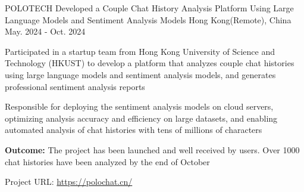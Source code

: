 
\newcommand{\expaddspace}[0]{
  \vspace{5.5mm}
}


\begin{cventries}

  \cventry
  {POLOTECH}
  {Developed a Couple Chat History Analysis Platform Using Large Language Models and Sentiment Analysis Models}
  {Hong Kong(Remote), China}
  {May. 2024 - Oct. 2024}
  {
    \begin{cvitems}
      \item {Participated in a startup team from Hong Kong University of Science and Technology (HKUST) to develop a platform that analyzes couple chat histories using large language models and sentiment analysis models, and generates professional sentiment analysis reports}
      \item {Responsible for deploying the sentiment analysis models on cloud servers, optimizing analysis accuracy and efficiency on large datasets, and enabling automated analysis of chat histories with tens of millions of characters}
      \item {\textbf{Outcome:} The project has been launched and well received by users. Over 1000 chat histories have been analyzed by the end of October}
      \item {Project URL: \href{https://polochat.cn/}{https://polochat.cn/}}
    \end{cvitems}
  }
  \expsaddspace

\end{cventries}
